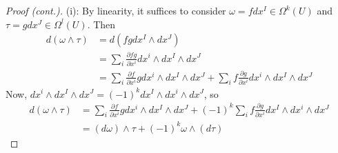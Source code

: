 \begin{frame}
  \begin{proof}[Proof (cont.)]
    (i): By linearity, it suffices to consider $\omega = fdx^I \in \Omega^k(U)$ and 
    $\tau = gdx^J \in \Omega^l(U)$.
    Then
    \begin{align*}
      d(\omega \wedge \tau) &=
      d(fg dx^I \wedge dx^J) \\
      &=
      \sum_i \frac{\partial fg}{\partial x^i} 
      dx^i \wedge
      dx^I \wedge dx^J \\
      &=
      \sum_i \frac{\partial f}{\partial x^i}g 
      dx^i \wedge
      dx^I \wedge  dx^J +
      \sum_i f \frac{\partial g}{\partial x^i} 
      dx^i \wedge
      dx^I \wedge dx^J 
    \end{align*}
    Now, $dx^i \wedge dx^I \wedge dx^J = (-1)^k dx^I \wedge dx^i \wedge dx^J$, 
    so
    \begin{align*}
      d(\omega \wedge \tau) &=
      \sum_i \frac{\partial f}{\partial x^i}g 
      dx^i \wedge
      dx^I \wedge  dx^J +
      (-1)^k
      \sum_i f \frac{\partial g}{\partial x^i} 
      dx^I
      \wedge dx^i
      \wedge dx^J  \\
      &= (d\omega) \wedge \tau + (-1)^k \omega \wedge (d\tau)
    \end{align*}
  \end{proof}
\end{frame}

